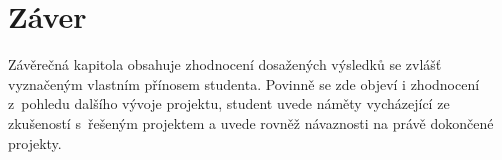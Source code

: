 \chapter*{Záver}

Závěrečná kapitola obsahuje zhodnocení dosažených výsledků se zvlášť vyznačeným vlastním přínosem studenta.
Povinně se zde objeví i zhodnocení z~pohledu dalšího vývoje projektu, student uvede náměty vycházející ze zkušeností s~řešeným projektem a uvede rovněž návaznosti na právě dokončené projekty.

\newpage
